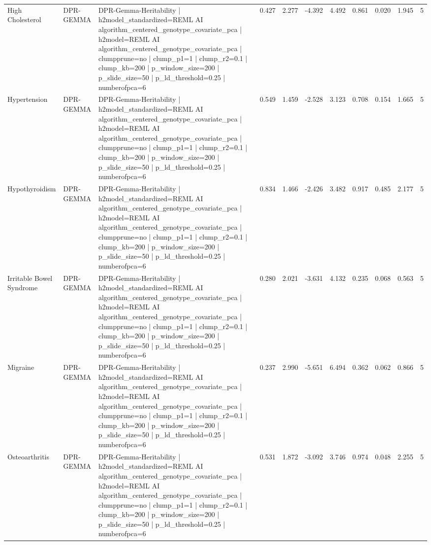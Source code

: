 \begin{landscape}
\begin{longtable}{p{2.4cm}p{1.8cm}p{6.0cm}rrrrrrrr}
High Cholesterol & DPR-GEMMA & DPR-Gemma-Heritability | h2model\_standardized=REML AI algorithm\_centered\_genotype\_covariate\_pca | h2model=REML AI algorithm\_centered\_genotype\_covariate\_pca | clumpprune=no | clump\_p1=1 | clump\_r2=0.1 | clump\_kb=200 | p\_window\_size=200 | p\_slide\_size=50 | p\_ld\_threshold=0.25 | numberofpca=6 & 0.427 & 2.277 & -4.392 & 4.492 & 0.861 & 0.020 & 1.945 & 5 \\
Hypertension & DPR-GEMMA & DPR-Gemma-Heritability | h2model\_standardized=REML AI algorithm\_centered\_genotype\_covariate\_pca | h2model=REML AI algorithm\_centered\_genotype\_covariate\_pca | clumpprune=no | clump\_p1=1 | clump\_r2=0.1 | clump\_kb=200 | p\_window\_size=200 | p\_slide\_size=50 | p\_ld\_threshold=0.25 | numberofpca=6 & 0.549 & 1.459 & -2.528 & 3.123 & 0.708 & 0.154 & 1.665 & 5 \\
Hypothyroidism & DPR-GEMMA & DPR-Gemma-Heritability | h2model\_standardized=REML AI algorithm\_centered\_genotype\_covariate\_pca | h2model=REML AI algorithm\_centered\_genotype\_covariate\_pca | clumpprune=no | clump\_p1=1 | clump\_r2=0.1 | clump\_kb=200 | p\_window\_size=200 | p\_slide\_size=50 | p\_ld\_threshold=0.25 | numberofpca=6 & 0.834 & 1.466 & -2.426 & 3.482 & 0.917 & 0.485 & 2.177 & 5 \\
Irritable Bowel Syndrome & DPR-GEMMA & DPR-Gemma-Heritability | h2model\_standardized=REML AI algorithm\_centered\_genotype\_covariate\_pca | h2model=REML AI algorithm\_centered\_genotype\_covariate\_pca | clumpprune=no | clump\_p1=1 | clump\_r2=0.1 | clump\_kb=200 | p\_window\_size=200 | p\_slide\_size=50 | p\_ld\_threshold=0.25 | numberofpca=6 & 0.280 & 2.021 & -3.631 & 4.132 & 0.235 & 0.068 & 0.563 & 5 \\
Migraine & DPR-GEMMA & DPR-Gemma-Heritability | h2model\_standardized=REML AI algorithm\_centered\_genotype\_covariate\_pca | h2model=REML AI algorithm\_centered\_genotype\_covariate\_pca | clumpprune=no | clump\_p1=1 | clump\_r2=0.1 | clump\_kb=200 | p\_window\_size=200 | p\_slide\_size=50 | p\_ld\_threshold=0.25 | numberofpca=6 & 0.237 & 2.990 & -5.651 & 6.494 & 0.362 & 0.062 & 0.866 & 5 \\
Osteoarthritis & DPR-GEMMA & DPR-Gemma-Heritability | h2model\_standardized=REML AI algorithm\_centered\_genotype\_covariate\_pca | h2model=REML AI algorithm\_centered\_genotype\_covariate\_pca | clumpprune=no | clump\_p1=1 | clump\_r2=0.1 | clump\_kb=200 | p\_window\_size=200 | p\_slide\_size=50 | p\_ld\_threshold=0.25 | numberofpca=6 & 0.531 & 1.872 & -3.092 & 3.746 & 0.974 & 0.048 & 2.255 & 5 \\

\end{longtable}
\end{landscape}
